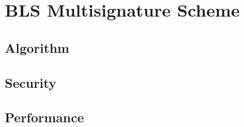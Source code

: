 \chapter{BLS Multisignature Scheme}
\section{Algorithm}
\cite{BLSMulti}
\section{Security}
\section{Performance}
